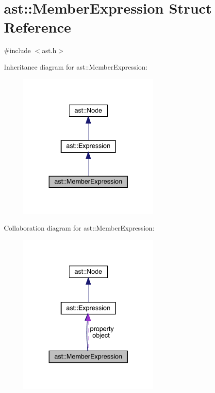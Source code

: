 \hypertarget{structast_1_1_member_expression}{}\section{ast\+:\+:Member\+Expression Struct Reference}
\label{structast_1_1_member_expression}


{\ttfamily \#include $<$ast.\+h$>$}



Inheritance diagram for ast\+:\+:Member\+Expression\+:\nopagebreak
\begin{figure}[H]
\begin{center}
\leavevmode
\includegraphics[width=201pt]{structast_1_1_member_expression__inherit__graph}
\end{center}
\end{figure}


Collaboration diagram for ast\+:\+:Member\+Expression\+:\nopagebreak
\begin{figure}[H]
\begin{center}
\leavevmode
\includegraphics[width=201pt]{structast_1_1_member_expression__coll__graph}
\end{center}
\end{figure}
